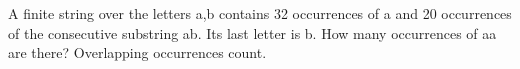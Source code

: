 A finite string over the letters a,b contains 32 occurrences of a and 20 occurrences of the consecutive substring ab. Its last letter is b. How many occurrences of aa are there? Overlapping occurrences count.
